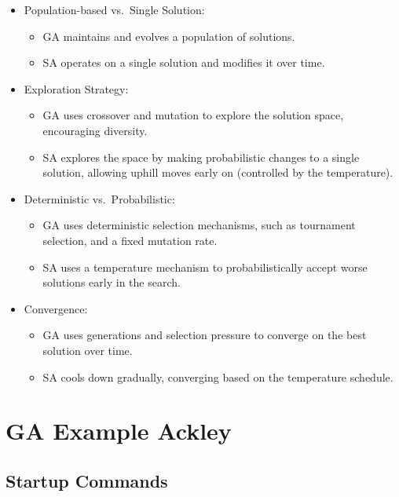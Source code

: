 \documentclass[
  letterpaper,
  DIV=11,
  numbers=noendperiod]{scrreprt}
\providecommand{\tightlist}{%
  \setlength{\itemsep}{0pt}\setlength{\parskip}{0pt}}\usepackage{longtable,booktabs,array}
\begin{document}
\begin{itemize}
\tightlist
\item
  Population-based vs.~Single Solution:

  \begin{itemize}
  \tightlist
  \item
    GA maintains and evolves a population of solutions.
  \item
    SA operates on a single solution and modifies it over time.
  \end{itemize}
\item
  Exploration Strategy:

  \begin{itemize}
  \tightlist
  \item
    GA uses crossover and mutation to explore the solution space,
    encouraging diversity.
  \item
    SA explores the space by making probabilistic changes to a single
    solution, allowing uphill moves early on (controlled by the
    temperature).
  \end{itemize}
\item
  Deterministic vs.~Probabilistic:

  \begin{itemize}
  \tightlist
  \item
    GA uses deterministic selection mechanisms, such as tournament
    selection, and a fixed mutation rate.
  \item
    SA uses a temperature mechanism to probabilistically accept worse
    solutions early in the search.
  \end{itemize}
\item
  Convergence:

  \begin{itemize}
  \tightlist
  \item
    GA uses generations and selection pressure to converge on the best
    solution over time.
  \item
    SA cools down gradually, converging based on the temperature
    schedule.
  \end{itemize}
\end{itemize}


\chapter{GA Example Ackley}\label{ga-example-ackley}

\section{Startup Commands}\label{startup-commands}
\end{document}
